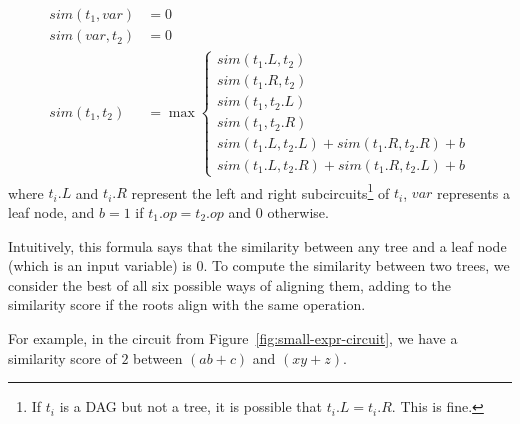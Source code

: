 \begin{align*}
    sim(t_1, var) &= 0\\
    sim(var, t_2) &= 0\\
    sim(t_1, t_2) &= \max \begin{cases}
        sim(t_1.L, t_2)\\
        sim(t_1.R, t_2)\\
        sim(t_1, t_2.L)\\
        sim(t_1, t_2.R)\\
        sim(t_1.L, t_2.L) + sim(t_1.R, t_2.R) + b\\
        sim(t_1.L, t_2.R) + sim(t_1.R, t_2.L) + b
    \end{cases}
\end{align*}
where $t_i.L$ and $t_i.R$ represent the left and right subcircuits\footnote{If $t_i$ is a DAG but not a tree, it is possible that $t_i.L = t_i.R$. This is fine.} of $t_i$, $var$ represents a leaf node, and $b = 1$ if $t_1.op = t_2.op$ and $0$ otherwise.

Intuitively, this formula says that the similarity between any tree and a leaf node (which is an input variable) is $0$.
To compute the similarity between two trees, we consider the best of all six possible ways of aligning them, adding to the similarity score if the roots align with the same operation. 

For example, in the circuit from Figure~\ref{fig:small-expr-circuit}, we have a similarity score of $2$ between $(ab + c)$ and $(xy + z)$. 



